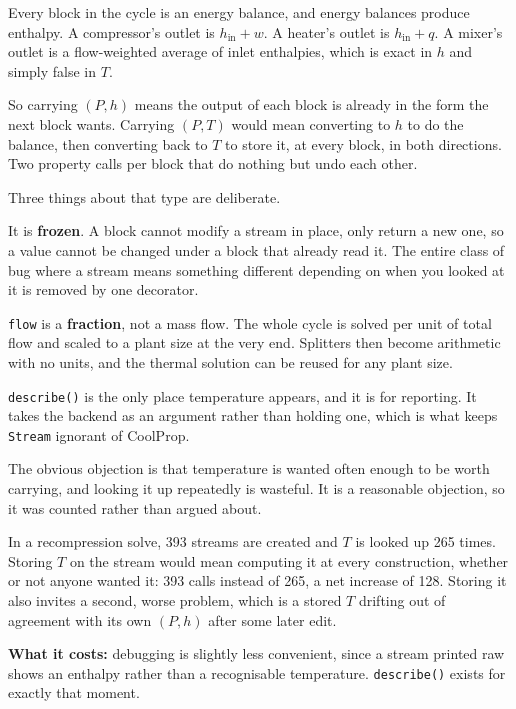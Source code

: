 \documentclass[11pt,a4paper]{report}
\newcommand{\code}[1]{\texttt{\small #1}}
\begin{document}
Every block in the cycle is an energy balance, and energy balances produce
enthalpy. A compressor's outlet is $h_{\text{in}} + w$. A heater's outlet is
$h_{\text{in}} + q$. A mixer's outlet is a flow-weighted average of inlet
enthalpies, which is exact in $h$ and simply false in $T$.

So carrying $(P,h)$ means the output of each block is already in the form
the next block wants. Carrying $(P,T)$ would mean converting to $h$ to do
the balance, then converting back to $T$ to store it, at every block, in
both directions. Two property calls per block that do nothing but undo each
other.


\noindent Three things about that type are deliberate.

It is \textbf{frozen}. A block cannot modify a stream in place, only return
a new one, so a value cannot be changed under a block that already read it.
The entire class of bug where a stream means something different depending
on when you looked at it is removed by one decorator.

\code{flow} is a \textbf{fraction}, not a mass flow. The whole cycle is
solved per unit of total flow and scaled to a plant size at the very end.
Splitters then become arithmetic with no units, and the thermal solution can
be reused for any plant size.

\code{describe()} is the only place temperature appears, and it is for
reporting. It takes the backend as an argument rather than holding one,
which is what keeps \code{Stream} ignorant of CoolProp.

\begin{caveat}[title={Caveat: temperature is not stored, and this was measured before deciding}]
The obvious objection is that temperature is wanted often enough to be worth
carrying, and looking it up repeatedly is wasteful. It is a reasonable
objection, so it was counted rather than argued about.

In a recompression solve, \num{393} streams are created and $T$ is looked up
\num{265} times. Storing $T$ on the stream would mean computing it at every
construction, whether or not anyone wanted it: \num{393} calls instead of
\num{265}, a net increase of \num{128}. Storing it also invites a second,
worse problem, which is a stored $T$ drifting out of agreement with its own
$(P,h)$ after some later edit.

\textbf{What it costs:} debugging is slightly less convenient, since a
stream printed raw shows an enthalpy rather than a recognisable temperature.
\code{describe()} exists for exactly that moment.
\end{caveat}
\end{document}

